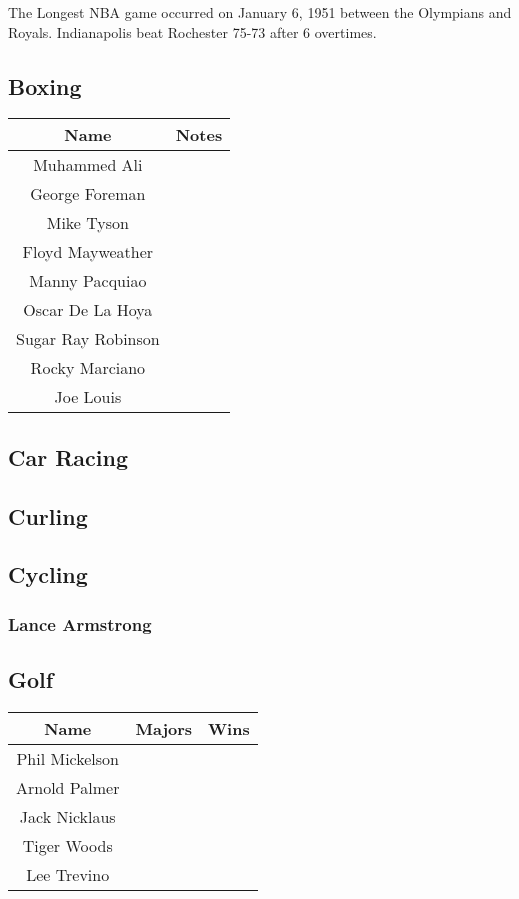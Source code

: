 			The Longest NBA game occurred on January 6, 1951 between the Olympians and Royals. Indianapolis beat Rochester 75-73 after 6 overtimes.
			
			
		
		\newpage		
		\subsection{Boxing}
		\begin{tabular}{|c|c|}
				\hline
			\textbf{Name} & \textbf{Notes} \\
			\hline
			Muhammed Ali &   \\
			\hline
			George Foreman  & \\
			\hline
			Mike Tyson & \\
			\hline
			Floyd Mayweather &  \\
			\hline
			Manny Pacquiao &  \\
			\hline
			Oscar De La Hoya & \\
			\hline
			Sugar Ray Robinson & \\
			\hline
			Rocky Marciano & \\
			\hline
			Joe Louis & \\
			\hline
			
			
			\hline
		\end{tabular}

		\subsection{Car Racing}
		
		\subsection{Curling}
		\subsection{Cycling}
			\subsubsection{Lance Armstrong}
			
		\subsection{Golf}
			\begin{tabular}{|c|c|c|}
				\hline
				\textbf{Name} & \textbf{Majors} & \textbf{Wins} \\
				\hline
				Phil Mickelson & &  \\
				\hline
				Arnold Palmer & & \\
				\hline
				Jack Nicklaus & & \\
				\hline
				Tiger Woods & & \\
				\hline
				Lee Trevino & & \\
				
				\hline
				
			\end{tabular}
				
